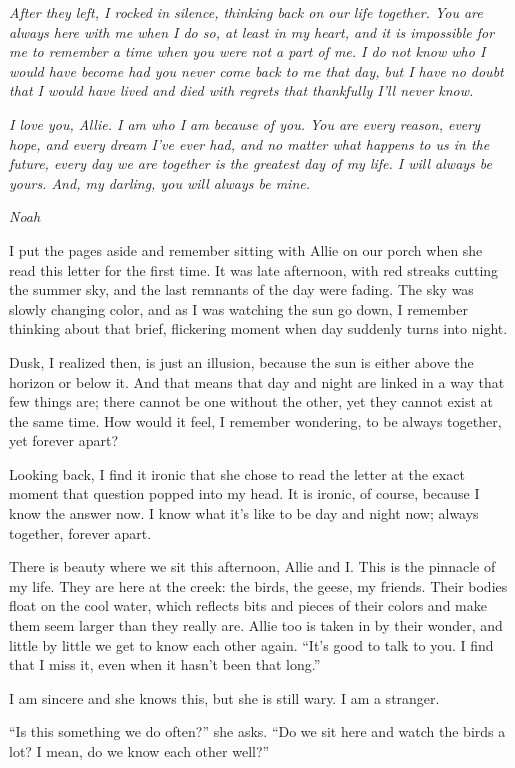 \documentclass[10pt, twoside, openright]{book}
\begin{document}
\emph{After they left, I rocked in silence, thinking back on our life
together. You are always here with me when I do so, at least in my
heart, and it is impossible for me to remember a time when you were not
a part of me. I do not know who I would have become had you never come
back to me that day, but I have no doubt that I would have lived and
died with regrets that thankfully I'll never know.}

\emph{I love you, Allie. I am who I am because of you. You are every
reason, every hope, and every dream I've ever had, and no matter what
happens to us in the future, every day we are together is the greatest
day of my life. I will always be yours. And, my darling, you will always
be mine.}

\emph{Noah}


I put the pages aside and remember sitting with Allie on our porch when
she read this letter for the first time. It was late afternoon, with red
streaks cutting the summer sky, and the last remnants of the day were
fading. The sky was slowly changing color, and as I was watching the sun
go down, I remember thinking about that brief, flickering moment when
day suddenly turns into night.

Dusk, I realized then, is just an illusion, because the sun is either
above the horizon or below it. And that means that day and night are
linked in a way that few things are; there cannot be one without the
other, yet they cannot exist at the same time. How would it feel, I
remember wondering, to be always together, yet forever apart?

Looking back, I find it ironic that she chose to read the letter at the
exact moment that question popped into my head. It is ironic, of course,
because I know the answer now. I know what it's like to be day and night
now; always together, forever apart.

There is beauty where we sit this afternoon, Allie and I. This is the
pinnacle of my life. They are here at the creek: the birds, the geese,
my friends. Their bodies float on the cool water, which reflects bits
and pieces of their colors and make them seem larger than they really
are. Allie too is taken in by their wonder, and little by little we get
to know each other again. ``It's good to talk to you. I find that I miss
it, even when it hasn't been that long.''


I am sincere and she knows this, but she is still wary. I am a stranger.


``Is this something we do often?'' she asks. ``Do we sit here and watch
the birds a lot? I mean, do we know each other well?''
\end{document}
